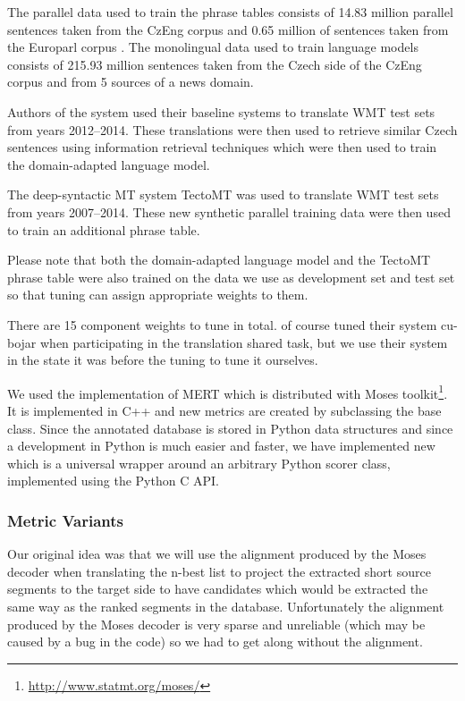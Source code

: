The parallel data used to train the phrase tables consists of 14.83 million
parallel sentences taken from the CzEng corpus  and 0.65
million of sentences taken from the Europarl corpus .
The monolingual data used to train language models consists of 215.93 million
sentences taken from the Czech side of the CzEng corpus and from 5 sources of
a news domain. 

Authors of the system used their baseline systems to translate WMT test sets
from years 2012--2014.  These translations were then used to retrieve similar
Czech sentences using information retrieval techniques which were then used to
train the domain-adapted language model.

The deep-syntactic MT system TectoMT was used to translate WMT test sets from
years 2007--2014. These new synthetic parallel training data were then used to 
train an additional phrase table. 

Please note that both the domain-adapted language model and the TectoMT phrase
table were also trained on the data we use as development set and test set so
that tuning can assign appropriate weights to them.

There are 15 component weights to tune in total.  of
course tuned their system cu-bojar when participating in the translation shared
task, but we use their system in the state it was before the tuning to tune it ourselves. 

We used the implementation of MERT which is distributed with Moses
toolkit\footnote{\url{http://www.statmt.org/moses/}}. It is implemented in C++
and new metrics are created by subclassing the base  class. Since
the annotated database is stored in Python data structures and since a
development in Python is much easier and faster, we have implemented new
 which is a universal wrapper around an arbitrary Python
scorer class, implemented using the Python C API.


\subsubsection{Metric Variants}

Our original idea was that we will use the alignment produced by the Moses
decoder when translating the n-best list to project the extracted short
source segments to the target side to have candidates which would be extracted
the same way as the ranked segments in the database. Unfortunately the
alignment produced by the Moses decoder is very sparse and unreliable (which may be
caused by a bug in the code) so we had to get along without the alignment.

